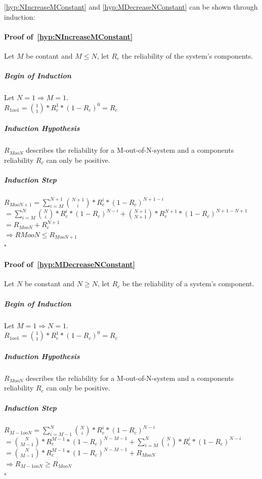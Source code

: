 \autoref{hyp:NIncreaseMConstant} and \autoref{hyp:MDecreaseNConstant} can be shown through induction:

\paragraph{Proof of~\autoref{hyp:NIncreaseMConstant}}
Let $M$ be contant and $M \leq N$, let $R_{c}$ the reliability of the system's components.

\subparagraph{Begin of Induction}
Let $N = 1 \Rightarrow M = 1$.\\
$R_{1oo1} = {1 \choose 1} * R_{c}^1 * (1 - R_{c})^0 = R_{c}$

\subparagraph{Induction Hypothesis}
$R_{MooN}$ describes the reliability for a M-out-of-N-system and a components reliability $R_{c}$ can only be positive.

\subparagraph{Induction Step}
$R_{MooN+1} = \sum_{i=M}^{N+1} {N + 1 \choose i} * R_{c}^i * (1 - R_c)^{N + 1 - i}$\\
$= \sum_{i=M}^{N} {N \choose i} * R_{c}^i * (1 - R_c)^{N - i} + {N+1 \choose N+1} * R_c^{N+1} * (1 - R_c)^{N+1 - N+1}$\\
$= R_{MooN} + R_c^{N+1}$ \\
$\Rightarrow R{MooN} \leq R_{MooN+1}$\\
$\square$


\paragraph{Proof of~\autoref{hyp:MDecreaseNConstant}}
Let $N$ be constant and $N \geq N$, let $R_c$ be the reliability of a system's component.

\subparagraph{Begin of Induction}
Let $M = 1 \Rightarrow N = 1$.\\
$R_{1oo1} = {1 \choose 1} * R_{c}^1 * (1 - R_{c})^0 = R_{c}$

\subparagraph{Induction Hypothesis}
$R_{MooN}$ describes the reliability for a M-out-of-N-system and a components reliability $R_{c}$ can only be positive.

\subparagraph{Induction Step}
$R_{M-1ooN} = \sum_{i=M-1}^{N} {N \choose i} * R_{c}^i * (1 - R_c)^{N - i}$\\
$= {N \choose M-1} * R_c^{M-1} * (1 - R_c)^{N - M-1} + \sum_{i=M}^{N} {N \choose i} * R_{c}^i * (1 - R_c)^{N - i}$\\
$= {N \choose M-1} * R_c^{M-1} * (1 - R_c)^{N - M-1} + R_{MooN}$\\
$\Rightarrow R_{M-1ooN} \geq R_{MooN}$\\
$\square$

